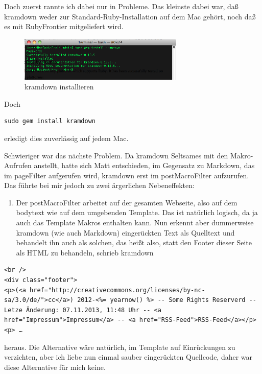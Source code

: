 \documentclass[11pt]{report}
\begin{document}
Doch zuerst rannte ich dabei nur in Probleme. Das kleinste dabei war,
daß kramdown weder zur Standard-Ruby-Installation auf dem Mac gehört,
noch daß es mit RubyFrontier mitgeliefert wird.

\begin{figure}[h!]
\centering
\includegraphics[width=0.7\textwidth]{./images/installingkramdown.png}
\caption{\label{installingkramdown}kramdown installieren}
\end{figure}


Doch


\begin{verbatim}
sudo gem install kramdown
\end{verbatim}

erledigt dies zuverlässig auf jedem Mac.

Schwieriger war das nächste Problem. Da kramdown Seltsames mit den
Makro-Aufrufen anstellt, hatte sich Matt entschieden, im Gegensatz zu
Markdown, das im pageFilter aufgerufen wird, kramdown erst im
postMacroFilter aufzurufen. Das führte bei mir jedoch zu zwei
ärgerlichen Nebeneffekten:


\begin{enumerate}
\item Der postMacroFilter arbeitet auf der gesamten Webseite, also auf
   dem bodytext wie auf dem umgebenden Template. Das ist natürlich
   logisch, da ja auch das Template Makros enthalten kann. Nun erkennt
   aber dummerweise kramdown (wie auch Markdown) eingerückten Text als
   Quelltext und behandelt ihn auch als solchen, das heißt also, statt
   den Footer dieser Seite als HTML zu behandeln, schrieb kramdown
\end{enumerate}


\begin{verbatim}
<br />
<div class="footer">
<p>(<a href="http://creativecommons.org/licenses/by-nc-sa/3.0/de/">cc</a>) 2012-<%= yearnow() %> -- Some Rights Reserverd -- Letze Änderung: 07.11.2013, 11:48 Uhr -- <a href="Impressum">Impressum</a> -- <a href="RSS-Feed">RSS-Feed</a></p>
<p> …
\end{verbatim}

heraus. Die Alternative wäre natürlich, im Template auf Einrückungen
zu verzichten, aber ich liebe nun einmal sauber eingerückten
Quellcode, daher war diese Alternative für mich keine.
\end{document}
